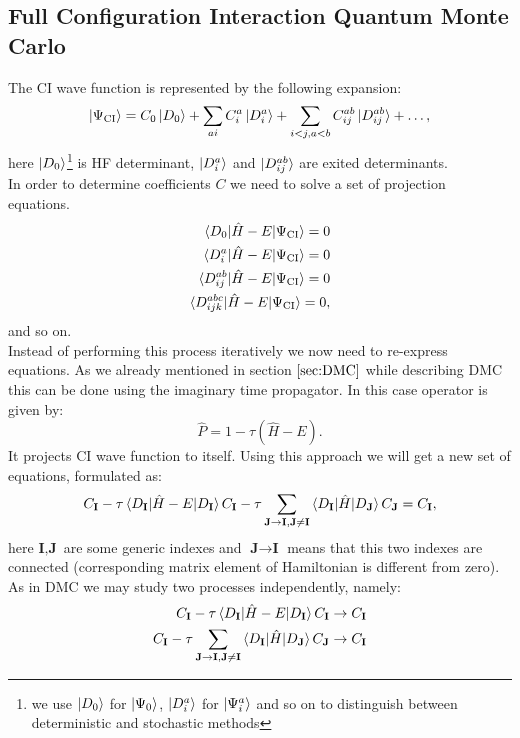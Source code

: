 \documentclass[twoside,english]{uiofysmaster}
\theoremstyle{definition}
\begin{document}
\subsection{Full Configuration Interaction Quantum Monte Carlo} \label{sec:FCIQMC}
The CI wave function is represented by the following expansion:
 \begin{equation}\label{eq:fciqmcWF}
\ket{\Psi_{\text{CI}}}= C_0\ket{D_0} + \sum_{ai} C_i^a \ket{D_i^a} + \sum_{i<j,a<b}C_{ij}^{ab}\ket{D_{ij}^{ab}} + \dots,
 \end{equation}
here $\ket{D_0}$\footnote{we use $\ket{D_0}$ for $\ket{\Psi_0}$, $\ket{D_i^a}$ for $\ket{\Psi_i^a}$ and so on to distinguish between deterministic and stochastic methods} is HF determinant, $\ket{D_i^a}$ and $\ket{D_{ij}^{ab}}$ are exited determinants.\\
In order to determine coefficients $C$ we need to solve a set of projection equations. 
\begin{align}
\braket{D_0|\hat{H}-E|\Psi_{\text{CI}}}=0\\
\braket{D_i^a|\hat{H}-E|\Psi_{\text{CI}}}=0\\
\braket{D_{ij}^{ab}|\hat{H}-E|\Psi_{\text{CI}}}=0\\
\braket{D_{ijk}^{abc}|\hat{H}-E|\Psi_{\text{CI}}}=0,
\end{align} 
and so on.\\
Instead of performing this process iteratively we now need to re-express equations. As we already mentioned in section $\ref{sec:DMC}$ while describing DMC this can be done using the imaginary time propagator. In this case operator is given by:
\begin{equation}\label{eq:projector} 
\hat{P}=1-\tau(\hat{H}-E).
\end{equation}
It projects CI wave function to itself. Using this approach we will get a new set of equations, formulated as:
\begin{equation}\label{eq:CIprojected}
C_{\textbf{I}} - \tau \braket{D_{\textbf{I}}|\hat{H}-E|D_{\textbf{I}}}C_{\textbf{I}} - \tau \sum_{\textbf{J}\rightarrow \textbf{I},\textbf{J}\neq \textbf{I} }  \braket{D_{\textbf{I}}|\hat{H}|D_{\textbf{J}}}C_{\textbf{J}} = C_{\textbf{I}},
\end{equation}
here $\textbf{I}, \textbf{J}$ are some generic indexes and $\textbf{J}\rightarrow \textbf{I}$ means that this two indexes are connected (corresponding matrix element of Hamiltonian is different from zero).
As in DMC we may study two processes independently, namely:
\begin{align}
C_{\textbf{I}} - \tau \braket{D_{\textbf{I}}|\hat{H}-E|D_{\textbf{I}}}C_{\textbf{I}} \rightarrow C_{\textbf{I}}\\\label{eq:FCIQMC_coef1}
C_{\textbf{I}} - \tau \sum_{\textbf{J}\rightarrow \textbf{I},\textbf{J}\neq \textbf{I} }  \braket{D_{\textbf{I}}|\hat{H}|D_{\textbf{J}}}C_{\textbf{J}} \rightarrow C_{\textbf{I}}\\ \label{eq:FCIQMC_coef2}
\end{align}
\end{document}
